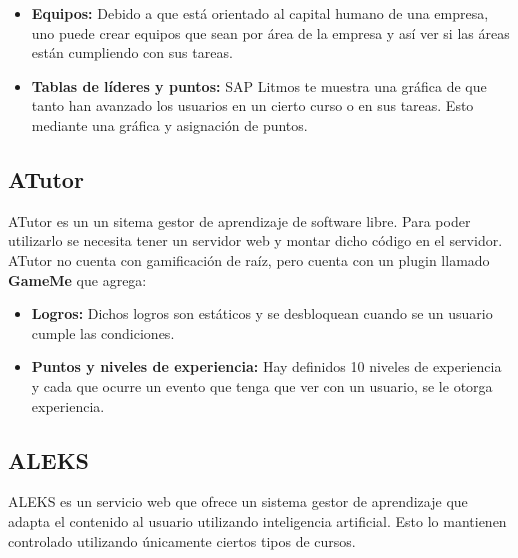 \begin{multicols*}{2}
\begin{itemize}
        \item {\bf Equipos: } Debido a que está orientado al capital humano
         de una empresa, uno puede crear equipos que sean por área de la
          empresa y así ver si las áreas están cumpliendo con sus tareas.
          
        \item {\bf Tablas de líderes y puntos: } SAP Litmos te muestra una
         gráfica de que tanto han avanzado los usuarios en un cierto curso
         o en sus tareas. Esto mediante una gráfica y asignación de puntos.
         
    \end{itemize}


\clearpage
\subsection*{ATutor}

ATutor es un un sitema gestor de aprendizaje de software libre. Para poder
utilizarlo se necesita tener un servidor web y montar dicho código en el servidor.\\
    
    \noindent ATutor no cuenta con gamificación de raíz,
    pero cuenta con un plugin llamado \textbf{GameMe} que agrega:
    
    \begin{itemize}
        \item {\bf Logros:} Dichos logros son estáticos y se
        desbloquean cuando se un usuario cumple las condiciones.
        
        \item {\bf Puntos y niveles de experiencia:} Hay definidos 10
        niveles de experiencia y cada que ocurre un evento que tenga
        que ver con un usuario, se le otorga experiencia.
        
    \end{itemize}



\subsection*{ALEKS}

ALEKS es un servicio web que ofrece un sistema gestor de aprendizaje
que adapta el contenido al usuario utilizando inteligencia artificial.
Esto lo mantienen controlado utilizando únicamente ciertos tipos de cursos.\\
    

\end{multicols*}
